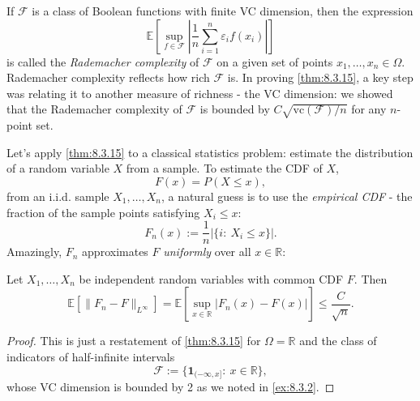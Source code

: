 \begin{remark}
\label{rmk:8.3.16}
If $\mathcal{F}$ is a class of Boolean functions with finite VC dimension, then the expression 
\[ \mathbb{E}\left[ \sup_{f \in \mathcal{F}} \left| \frac{1}{n}\sum_{i = 1}^{n} \varepsilon_i f(x_i) \right|
\right]\]
is called the \textit{Rademacher complexity} of $\mathcal{F}$ on a given set of points $x_1, \dots, x_n \in 
\Omega$. Rademacher complexity reflects how rich $\mathcal{F}$ is. In proving \cref{thm:8.3.15}, a key step 
was relating it to another measure of richness - the VC dimension: we showed that the Rademacher complexity of 
$\mathcal{F}$ is bounded by $C \sqrt{\mathrm{vc}(\mathcal{F}) / n}$ for any $n$-point set.
\end{remark}

Let's apply \cref{thm:8.3.15} to a classical statistics problem: estimate the distribution of a random variable 
$X$ from a sample. To estimate the CDF of $X$, 
\[ F(x) = P(X \leq x), \]
from an i.i.d. sample $X_1, \dots, X_n$, a natural guess is to use the \textit{empirical CDF} - the fraction 
of the sample points satisfying $X_i \leq x$:
\[ F_n(x) := \frac{1}{n}|\{ i: \ X_i \leq x \}|. \]
Amazingly, $F_n$ approximates $F$ \textit{uniformly} over all $x \in \mathbb{R}$: 

\begin{theorem}
\label{thm:8.3.17}
Let $X_1, \dots, X_n$ be independent random variables with common CDF $F$. Then 
\[ \mathbb{E}\left[ \lVert F_n - F \rVert_{L^{\infty}} \right] 
= \mathbb{E}\left[ \sup_{x \in \mathbb{R}}|F_n(x) - F(x)| \right] \leq \frac{C}{\sqrt{n}}. \]
\end{theorem}

\begin{proof}
This is just a restatement of \cref{thm:8.3.15} for $\Omega = \mathbb{R}$ and the class of indicators of 
half-infinite intervals 
\[ \mathcal{F} := \{ \mathbf{1}_{(-\infty, x]}: \ x \in \mathbb{R} \}, \]
whose VC dimension is bounded by 2 as we noted in \cref{ex:8.3.2}.
\end{proof}


